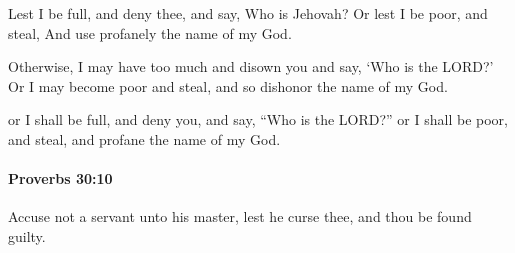 			\begin{versebox}
					\item[BHS] 
					\item[ASV] Lest I be full, and deny thee, and say, Who is Jehovah? Or lest I be poor, and steal, And use profanely the name of my God.
					\item[NIV] Otherwise, I may have too much and disown you and say, ‘Who is the LORD?’ Or I may become poor and steal, and so dishonor the name of my God.
					\item[NRSV] or I shall be full, and deny you, and say, “Who is the LORD?” or I shall be poor, and steal, and profane the name of my God.
			\end{versebox}

		\paragraph{Proverbs 30:10} %
			\label{PROVERBS-30-10}

			Accuse not a servant unto his master, lest he curse thee, and thou be found guilty.

